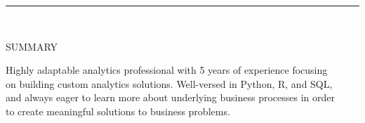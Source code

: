 \documentclass[12pt]{article}
\newcommand{\tab}[1][1cm]{\hspace*{#1}}
\newcommand{\header}[1]{
    \vspace*{-2mm}
    \rule{6.5in}{3pt} \\
    \smallskip
    \begin{large}
	    \textsc{\textcolor{lblue}{#1}}
    \end{large}
    \medskip
}
\begin{document}
  \pagestyle{empty} %

  \begin{flushleft}
    \header{SUMMARY}

    \tab Highly adaptable analytics professional with 5 years of experience focusing \\
    \tab on building custom analytics solutions. Well-versed in Python, R, and SQL, \\
    \tab and always eager to learn more about underlying business processes in order \\
    \tab to create meaningful solutions to business problems. \\

    \smallskip
  \end{flushleft}
\end{document}
